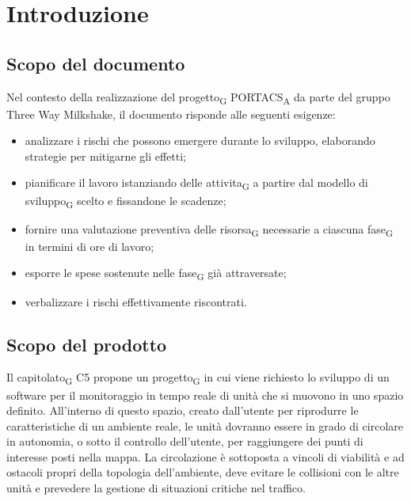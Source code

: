 \section{Introduzione}




\subsection{Scopo del documento}

Nel contesto della realizzazione del progetto\textsubscript{G} PORTACS\textsubscript{A} da parte del gruppo Three Way Milkshake, il documento risponde alle seguenti esigenze: 
\begin{itemize}
	\item analizzare i rischi che possono emergere durante lo sviluppo, elaborando strategie per mitigarne gli effetti;
	\item pianificare il lavoro istanziando delle attivita\textsubscript{G} a partire dal modello di sviluppo\textsubscript{G} scelto e fissandone le scadenze;
	\item fornire una valutazione preventiva delle risorsa\textsubscript{G} necessarie a ciascuna fase\textsubscript{G} in termini di ore di lavoro;
	\item esporre le spese sostenute nelle fase\textsubscript{G} già attraversate;
	\item verbalizzare i rischi effettivamente riscontrati.
\end{itemize}



\subsection{Scopo del prodotto}

Il capitolato\textsubscript{G} C5 propone un progetto\textsubscript{G} in cui viene richiesto lo sviluppo di un software per il monitoraggio in tempo reale di unità che si muovono in uno spazio definito. All’interno di questo spazio, creato dall’utente per riprodurre le caratteristiche di un ambiente reale, le unità dovranno essere in grado di circolare in autonomia, o sotto il controllo dell’utente, per raggiungere dei punti di interesse posti nella mappa.  La circolazione è sottoposta a vincoli di viabilità e ad ostacoli propri della topologia dell’ambiente, deve evitare le collisioni con le altre unità e prevedere la gestione di situazioni critiche nel traffico.




